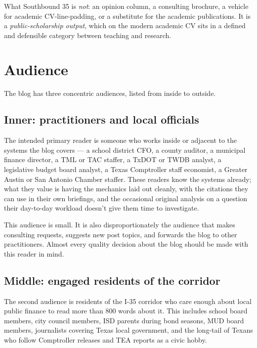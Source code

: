 \documentclass[11pt]{article}
\begin{document}
What Southbound 35 is \emph{not}: an opinion column, a consulting
brochure, a vehicle for academic CV-line-padding, or a substitute
for the academic publications. It is a \emph{public-scholarship
output}, which on the modern academic CV sits in a defined and
defensible category between teaching and research.

\section{Audience}

The blog has three concentric audiences, listed from inside to
outside.

\subsection{Inner: practitioners and local officials}

The intended primary reader is someone who works inside or
adjacent to the systems the blog covers --- a school district CFO,
a county auditor, a municipal finance director, a TML or TAC
staffer, a TxDOT or TWDB analyst, a legislative budget board
analyst, a Texas Comptroller staff economist, a Greater Austin
or San Antonio Chamber staffer. These readers know the systems
already; what they value is having the mechanics laid out
cleanly, with the citations they can use in their own briefings,
and the occasional original analysis on a question their
day-to-day workload doesn't give them time to investigate.

This audience is small. It is also disproportionately the audience
that makes consulting requests, suggests new post topics, and
forwards the blog to other practitioners. Almost every quality
decision about the blog should be made with this reader in mind.

\subsection{Middle: engaged residents of the corridor}

The second audience is residents of the I-35 corridor who care
enough about local public finance to read more than 800 words
about it. This includes school board members, city council members,
ISD parents during bond seasons, MUD board members, journalists
covering Texas local government, and the long-tail of Texans who
follow Comptroller releases and TEA reports as a civic hobby.
\end{document}

